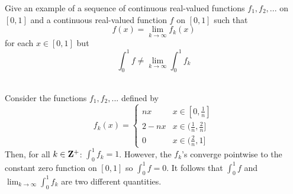 \begin{exercise}
    Give an example of a sequence of continuous real-valued functions $f_1, f_2, ...$ on $[0,1]$ and a continuous real-valued function $f$ on $[0,1]$ such that
    $$f(x) = \lim_{k \rightarrow \infty}f_k(x)$$
    for each $x \in [0,1]$ but
    $$\int_{0}^{1}f \neq \lim_{k \rightarrow \infty}\int_{0}^{1}f_k$$
\end{exercise}

\begin{solution}
    \\ Consider the functions $f_1, f_2, ...$ defined by 
    $$f_k(x) = \begin{cases}
        nx & x\in [0, \frac{1}{n}] \\
        2 - nx & x \in (\frac{1}{n}, \frac{2}{n}] \\
        0 & x \in (\frac{2}{n}, 1]
    \end{cases}$$
    Then, for all $k \in \mathbf{Z}^+$: $\int_{0}^{1}f_k  = 1$. However, the $f_k$'s converge pointwise to the constant zero function on $[0,1]$ so $\int_{0}^{1}f = 0$. It follows that $\int_{0}^{1}f$ and $\lim_{k \rightarrow \infty}\int_{0}^{1}f_k$ are two different quantities.
\end{solution}